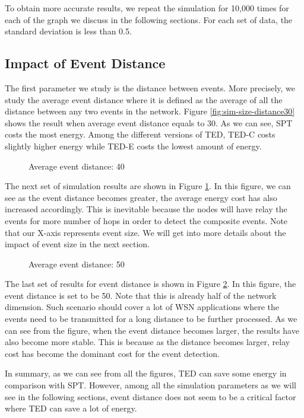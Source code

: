 To obtain more accurate results, we repeat the simulation for 10,000 times for each of the graph we discuss in the following sections. For each set of data, the standard deviation is less than 0.5.

\subsection{Impact of Event Distance}
The first parameter we study is the distance between events. More precisely, we study the average event distance where it is defined as the average of all the distance between any two events in the network. Figure \ref{fig:sim-size-distance30} shows the result when average event distance equals to 30. As we can see, SPT costs the most energy. Among the different versions of TED, TED-C costs slightly higher energy while TED-E costs the lowest amount of energy.

\begin{figure}
\centering
{}
\caption{Average event distance: 40}
\label{fig:sim-size-distance40}
\end{figure}

The next set of simulation results are shown in Figure \ref{fig:sim-size-distance40}. In this figure, we can see as the event distance becomes greater, the average energy cost has also increased accordingly. This is inevitable because the nodes will have relay the events for more number of hops in order to detect the composite events. Note that our X-axis represents event size. We will get into more details about the impact of event size in the next section.

\begin{figure}
\centering
{}
\caption{Average event distance: 50}
\label{fig:sim-size-distance50}
\end{figure}

The last set of results for event distance is shown in Figure \ref{fig:sim-size-distance50}. In this figure, the event distance is set to be 50. Note that this is already half of the network dimension. Such scenario should cover a lot of WSN applications where the events need to be transmitted for a long distance to be further processed. As we can see from the figure, when the event distance becomes larger, the results have also become more stable. This is because as the distance becomes larger, relay cost has become the dominant cost for the event detection.

In summary, as we can see from all the figures, TED can save some energy in comparison with SPT. However, among all the simulation parameters as we will see in the following sections, event distance does not seem to be a critical factor where TED can save a lot of energy.

